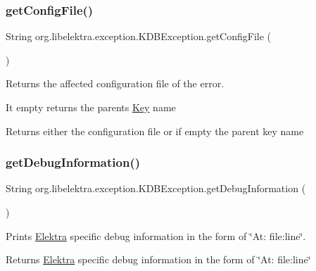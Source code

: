 \subsubsection{\texorpdfstring{get\+Config\+File()}{getConfigFile()}}
{\footnotesize\ttfamily String org.\+libelektra.\+exception.\+K\+D\+B\+Exception.\+get\+Config\+File (\begin{DoxyParamCaption}{ }\end{DoxyParamCaption})\hspace{0.3cm}{\ttfamily [inline]}}



Returns the affected configuration file of the error. 

It empty returns the parents \hyperlink{classorg_1_1libelektra_1_1Key}{Key} name

\begin{DoxyReturn}{Returns}
either the configuration file or if empty the parent key name 
\end{DoxyReturn}
\mbox{\label{classorg_1_1libelektra_1_1exception_1_1KDBException_ad43f4032095b1bfa1dc5065c5e01f9bb}} 
\subsubsection{\texorpdfstring{get\+Debug\+Information()}{getDebugInformation()}}
{\footnotesize\ttfamily String org.\+libelektra.\+exception.\+K\+D\+B\+Exception.\+get\+Debug\+Information (\begin{DoxyParamCaption}{ }\end{DoxyParamCaption})\hspace{0.3cm}{\ttfamily [inline]}}



Prints \hyperlink{interfaceorg_1_1libelektra_1_1Elektra}{Elektra} specific debug information in the form of \char`\"{}\+At\+: file\+:line\char`\"{}. 

\begin{DoxyReturn}{Returns}
\hyperlink{interfaceorg_1_1libelektra_1_1Elektra}{Elektra} specific debug information in the form of \char`\"{}\+At\+: file\+:line\char`\"{} 
\end{DoxyReturn}
\mbox{\label{classorg_1_1libelektra_1_1exception_1_1KDBException_a8fd8c0decfe1f1f6243407614d042101}} 
